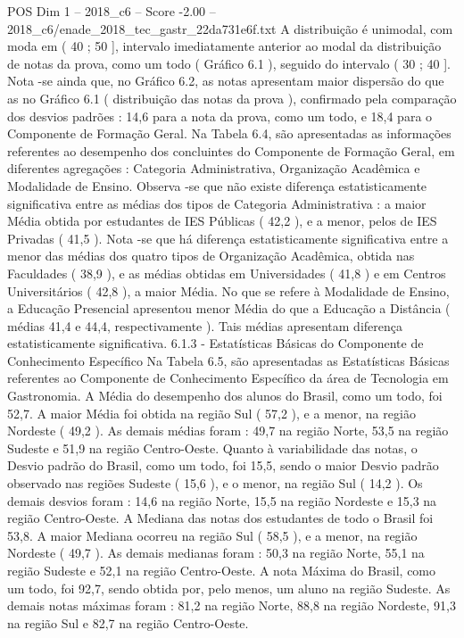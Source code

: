 \begin{textsample}{POS Dim 1 – 2018\_c6 – Score -2.00 – 2018\_c6/enade\_2018\_tec\_gastr\_22da731e6f.txt}
A distribuição é unimodal, com moda em ( 40 ; 50 ], intervalo imediatamente anterior ao modal da distribuição de notas da prova, como um todo ( Gráfico 6.1 ), seguido do intervalo ( 30 ; 40 ].
Nota -se ainda que, no Gráfico 6.2, as notas apresentam maior dispersão do que as no Gráfico 6.1 ( distribuição das notas da prova ), confirmado pela comparação dos desvios padrões : 14,6 para a nota da prova, como um todo, e 18,4 para o Componente de Formação Geral.
Na Tabela 6.4, são apresentadas as informações referentes ao desempenho dos concluintes do Componente de Formação Geral, em diferentes agregações : Categoria Administrativa, Organização Acadêmica e Modalidade de Ensino.
Observa -se que não existe diferença estatisticamente significativa entre as médias dos tipos de Categoria Administrativa : a maior Média obtida por estudantes de IES Públicas ( 42,2 ), e a menor, pelos de IES Privadas ( 41,5 ).
Nota -se que há diferença estatisticamente significativa entre a menor das médias dos quatro tipos de Organização Acadêmica, obtida nas Faculdades ( 38,9 ), e as médias obtidas em Universidades ( 41,8 ) e em Centros Universitários ( 42,8 ), a maior Média.
No que se refere à Modalidade de Ensino, a Educação Presencial apresentou menor Média do que a Educação a Distância ( médias 41,4 e 44,4, respectivamente ).
Tais médias apresentam diferença estatisticamente significativa. 6.1.3 - Estatísticas Básicas do Componente de Conhecimento Específico Na Tabela 6.5, são apresentadas as Estatísticas Básicas referentes ao Componente de Conhecimento Específico da área de Tecnologia em Gastronomia.
A Média do desempenho dos alunos do Brasil, como um todo, foi 52,7.
A maior Média foi obtida na região Sul ( 57,2 ), e a menor, na região Nordeste ( 49,2 ).
As demais médias foram : 49,7 na região Norte, 53,5 na região Sudeste e 51,9 na região Centro-Oeste.
Quanto à variabilidade das notas, o Desvio padrão do Brasil, como um todo, foi 15,5, sendo o maior Desvio padrão observado nas regiões Sudeste ( 15,6 ), e o menor, na região Sul ( 14,2 ).
Os demais desvios foram : 14,6 na região Norte, 15,5 na região Nordeste e 15,3 na região Centro-Oeste.
A Mediana das notas dos estudantes de todo o Brasil foi 53,8.
A maior Mediana ocorreu na região Sul ( 58,5 ), e a menor, na região Nordeste ( 49,7 ).
As demais medianas foram : 50,3 na região Norte, 55,1 na região Sudeste e 52,1 na região Centro-Oeste.
A nota Máxima do Brasil, como um todo, foi 92,7, sendo obtida por, pelo menos, um aluno na região Sudeste.
As demais notas máximas foram : 81,2 na região Norte, 88,8 na região Nordeste, 91,3 na região Sul e 82,7 na região Centro-Oeste.

\end{textsample}
